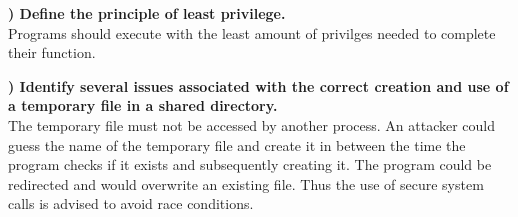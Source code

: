 \documentclass{report}
\newcommand{\mysubsection}[2]{\textbf{\romannumeral #1) #2}}
\begin{document}
\noindent\mysubsection{4}{Define the principle of least privilege.}
\\Programs should execute with the least amount of privilges needed to
complete their function.

\noindent\mysubsection{5}{Identify several issues associated with the correct creation and use of a temporary file in a shared directory.}
\\The temporary file must not be accessed by another process. An attacker
could guess the name of the temporary file and create it in between the time
the program checks if it exists and subsequently creating it. The program
could be redirected and would overwrite an existing file. Thus the use of
secure system calls is advised to avoid race conditions.

\end{document}
